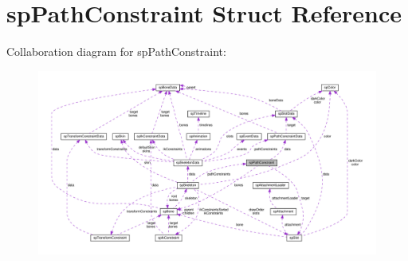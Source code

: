 \hypertarget{structspPathConstraint}{}\section{sp\+Path\+Constraint Struct Reference}
\label{structspPathConstraint}


Collaboration diagram for sp\+Path\+Constraint\+:
\nopagebreak
\begin{figure}[H]
\begin{center}
\leavevmode
\includegraphics[width=350pt]{structspPathConstraint__coll__graph}
\end{center}
\end{figure}
